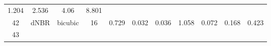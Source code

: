 \documentclass[twoside,12pt,final]{ucthesis-CA2012}
\begin{document}
\begin{ucmainmatter}
\begin{longtable}[]{@{}ccccccccccc@{}}
\begin{minipage}[t]{0.07\columnwidth}
1.204\strut
\end{minipage} & \begin{minipage}[t]{0.05\columnwidth}\centering\strut
2.536\strut
\end{minipage} & \begin{minipage}[t]{0.05\columnwidth}\centering\strut
4.06\strut
\end{minipage} & \begin{minipage}[t]{0.05\columnwidth}\centering\strut
8.801\strut
\end{minipage}\tabularnewline
\begin{minipage}[t]{0.04\columnwidth}\centering\strut
42\strut
\end{minipage} & \begin{minipage}[t]{0.11\columnwidth}\centering\strut
dNBR\strut
\end{minipage} & \begin{minipage}[t]{0.06\columnwidth}\centering\strut
bicubic\strut
\end{minipage} & \begin{minipage}[t]{0.08\columnwidth}\centering\strut
16\strut
\end{minipage} & \begin{minipage}[t]{0.08\columnwidth}\centering\strut
0.729\strut
\end{minipage} & \begin{minipage}[t]{0.07\columnwidth}\centering\strut
0.032\strut
\end{minipage} & \begin{minipage}[t]{0.07\columnwidth}\centering\strut
0.036\strut
\end{minipage} & \begin{minipage}[t]{0.07\columnwidth}\centering\strut
1.058\strut
\end{minipage} & \begin{minipage}[t]{0.05\columnwidth}\centering\strut
0.072\strut
\end{minipage} & \begin{minipage}[t]{0.05\columnwidth}\centering\strut
0.168\strut
\end{minipage} & \begin{minipage}[t]{0.05\columnwidth}\centering\strut
0.423\strut
\end{minipage}\tabularnewline
\begin{minipage}[t]{0.04\columnwidth}\centering\strut
43\strut
\end{minipage} & \begin{minipage}[t]{0.11\columnwidth}\centering\strut

\end{minipage}
\end{longtable}
\end{ucmainmatter}
\end{document}
